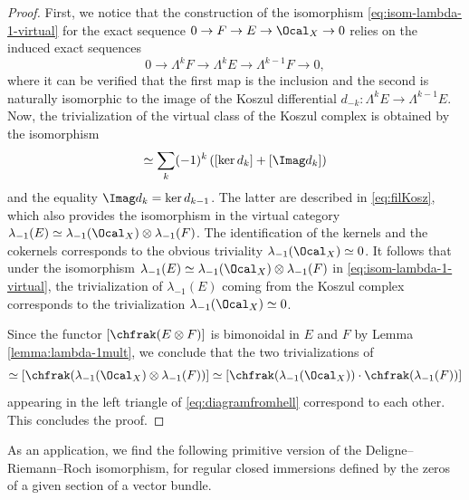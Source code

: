 \begin{proof}
First, we notice that the construction of the isomorphism \eqref{eq:isom-lambda-1-virtual} for the exact sequence $0\to F\to E\to\Ocal_{X}\to 0$ relies on the induced exact sequences\vspace*{-3pt}
\begin{equation}\label{eq:filKosz}
0\to\Lambda^{k}F\to \Lambda^{k}E\to\Lambda^{k-1}F\to 0,
\end{equation}
where it can be verified that the first map is the inclusion and the second is naturally isomorphic to the image of the Koszul differential $d_{-k}\colon\Lambda^{k}E\to\Lambda^{k-1}E$. Now, the trivialization of the virtual class of the Koszul complex is obtained by the isomorphism\vspace*{-3pt}
\begin{displaymath}
[K(\sigma)]\simeq \sum_{k}(-1)^{k} \left([\ker d_{k}]+ [\Imag d_{k}]\right)\vspace*{-3pt}
\end{displaymath}
and the equality $\Imag d_{k} = \ker d_{k-1}$. The latter are described in \eqref{eq:filKosz}, which also provides the isomorphism in the virtual category $\lambda_{-1}(E) \simeq \lambda_{-1}(\Ocal_X) \otimes \lambda_{-1}(F)$. The identification of the kernels and the cokernels corresponds to the obvious triviality $\lambda_{-1}(\Ocal_X) \simeq 0$. It follows that under the isomorphism $\lambda_{-1}(E)\simeq \lambda_{-1}(\Ocal_X) \otimes \lambda_{-1}(F)$ in
\eqref{eq:isom-lambda-1-virtual}, the trivialization of $\lambda_{-1}(E)$ coming from the Koszul complex corresponds to the trivialization $\lambda_{-1}(\Ocal_X)\simeq 0$.

Since the functor $[\chfrak(E \otimes F)]$ is bimonoidal in $E$ and $F$ by Lemma \ref{lemma:lambda-1mult}, we conclude that the two trivializations of\vspace*{-3pt}\enlargethispage{.5\baselineskip}
\begin{displaymath}
[\chfrak(\lambda_{-1}(E))] \simeq [\chfrak(\lambda_{-1}(\Ocal_X) \otimes \lambda_{-1}(F))] \simeq [\chfrak(\lambda_{-1}(\Ocal_X)) \cdot \chfrak(\lambda_{-1}(F))]
\end{displaymath}
appearing in the left triangle of \eqref{eq:diagramfromhell} correspond to each other. This concludes the proof.
\end{proof}

As an application, we find the following primitive version of the Deligne--Riemann--Roch isomorphism, for regular closed immersions defined by the zeros of a given section of a vector bundle.

